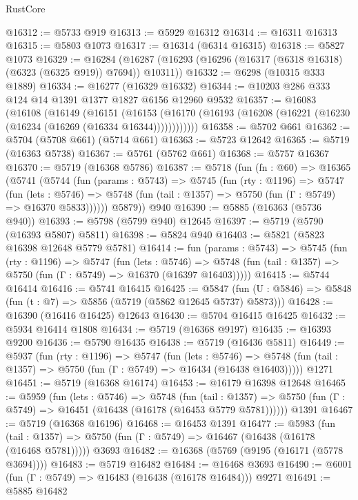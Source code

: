 \begin{lexlean}{RustCore}
\begin{coremodule}
@16312 := @5733 @919
@16313 := @5929 @16312
@16314 := @16311 @16313
@16315 := @5803 @1073
@16317 := @16314 (@6314 @16315)
@16318 := @5827 @1073
@16329 := @16284
    (@16287 (@16293 (@16296 (@16317 (@6318 @16318) (@6323 (@6325 @919)) @7694)) @10311))
@16332 := @6298 (@10315 @333 @1889)
@16334 := @16277 (@16329 @16332)
@16344 := @10203 @286 @333 @124 @14 @1391 @1377 @1827 @6156 @12960 @9532
@16357 := @16083
    (@16108
      (@16149
        (@16151
          (@16153 (@16170 (@16193 (@16208 (@16221 (@16230 (@16234 (@16269 (@16334 @16344))))))))))))
@16358 := @5702 @661
@16362 := @5704 (@5708 @661) (@5714 @661)
@16363 := @5723 @12642
@16365 := @5719 (@16363 @5738)
@16367 := @5761 (@5762 @661)
@16368 := @5757 @16367
@16370 := @5719 (@16368 @5786)
@16387 := @5718
    (fun (fn : @60) =>
    @16365
      (@5741
        (@5744
          (fun (params : @5743) =>
          @5745
            (fun (rty : @1196) =>
            @5747
              (fun (lets : @5746) =>
              @5748 (fun (tail : @1357) => @5750 (fun (Γ : @5749) => @16370 @5833))))))
        @5879))
    @940
@16390 := @5885 (@16363 (@5736 @940))
@16393 := @5798 (@5799 @940) @12645
@16397 := @5719 (@5790 (@16393 @5807) @5811)
@16398 := @5824 @940
@16403 := @5821 (@5823 @16398 @12648 @5779 @5781)
@16414 := fun (params : @5743) =>
  @5745
    (fun (rty : @1196) =>
    @5747
      (fun (lets : @5746) =>
      @5748 (fun (tail : @1357) => @5750 (fun (Γ : @5749) => @16370 (@16397 @16403)))))
@16415 := @5744 @16414
@16416 := @5741 @16415
@16425 := @5847
    (fun (U : @5846) => @5848 (fun (t : @7) => @5856 (@5719 (@5862 @12645 @5737) @5873)))
@16428 := @16390 (@16416 @16425) @12643
@16430 := @5704 @16415 @16425
@16432 := @5934 @16414 @1808
@16434 := @5719 (@16368 @9197)
@16435 := @16393 @9200
@16436 := @5790 @16435
@16438 := @5719 (@16436 @5811)
@16449 := @5937
    (fun (rty : @1196) =>
    @5747
      (fun (lets : @5746) =>
      @5748 (fun (tail : @1357) => @5750 (fun (Γ : @5749) => @16434 (@16438 @16403)))))
    @1271
@16451 := @5719 (@16368 @16174)
@16453 := @16179 @16398 @12648
@16465 := @5959
    (fun (lets : @5746) =>
    @5748
      (fun (tail : @1357) =>
      @5750 (fun (Γ : @5749) => @16451 (@16438 (@16178 (@16453 @5779 @5781))))))
    @1391
@16467 := @5719 (@16368 @16196)
@16468 := @16453 @1391
@16477 := @5983
    (fun (tail : @1357) => @5750 (fun (Γ : @5749) => @16467 (@16438 (@16178 (@16468 @5781)))))
    @3693
@16482 := @16368 (@5769 (@9195 (@16171 (@5778 @3694))))
@16483 := @5719 @16482
@16484 := @16468 @3693
@16490 := @6001 (fun (Γ : @5749) => @16483 (@16438 (@16178 @16484))) @9271
@16491 := @5885 @16482

\end{coremodule}
\end{lexlean}
